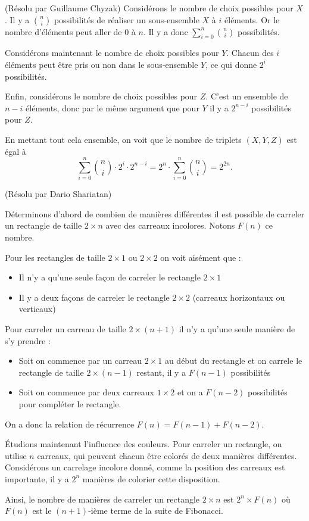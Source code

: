 \begin{sol}[73](R\'esolu par Guillaume Chyzak)
Consid\'erons le nombre de choix possibles pour $X$. Il y a $n\choose i$ possibilit\'es de r\'ealiser un sous-ensemble $X$ \`a $i$ \'el\'ements. Or le nombre d'\'el\'ements peut aller de 0 \`a $n$. Il y a donc $\sum_{i=0}^n {n\choose i}$ possibilit\'es.

Consid\'erons maintenant le nombre de choix possibles pour $Y$. Chacun des $i$ \'el\'ements peut \^etre pris ou non dans le sous-ensemble $Y$, ce qui donne $2^i$ possibilit\'es.

Enfin, consid\'erons le nombre de choix possibles pour $Z$. C'est un ensemble de $n-i$ \'el\'ements, donc par le m\^eme argument que pour $Y$ il y a $2^{n-i}$ possibilit\'es pour $Z$.

En mettant tout cela ensemble, on voit que le nombre de triplets $(X,Y,Z)$ est \'egal \`a
\[\sum_{i=0}^n {n\choose i} \cdot 2^i\cdot 2^{n-i}=2^n\cdot\sum_{i=0}^n {n\choose i}=2^{2n}.\]

\end{sol}

\begin{sol}[75](Résolu par Dario Shariatan)

Déterminons d'abord de combien de manières différentes il est possible de carreler un rectangle de taille $2 \times n$ avec des carreaux incolores. Notons $F(n)$ ce nombre.

Pour les rectangles de taille $2 \times 1$ ou $2 \times 2$ on voit aisément que :
\begin{itemize}
\item Il n'y a qu'une seule façon de carreler le rectangle $2\times 1$
\item Il y a deux façons de carreler le rectangle $2 \times 2$ (carreaux horizontaux ou verticaux)
\end{itemize}

Pour carreler un carreau de taille $2 \times (n+1)$ il n'y a qu'une seule manière de s'y prendre :
\begin{itemize}
\item Soit on commence par un carreau $2 \times 1$ au début du rectangle et on carrele le rectangle de taille $2 \times (n-1)$ restant, il y a $F(n-1)$ possibilités
\item Soit on commence par deux carreaux $1 \times 2$ et on a $F(n-2)$ possibilités pour compléter le rectangle.
\end{itemize}

On a donc la relation de récurrence $F(n) = F(n-1) + F(n-2)$.

Étudions maintenant l'influence des couleurs. Pour carreler un rectangle, on utilise $n$ carreaux, qui peuvent chacun être colorés de deux manières différentes. Considérons un carrelage incolore donné, comme la position des carreaux est importante, il y a $2^n$ manières de colorier cette disposition. 

Ainsi, le nombre de manières de carreler un rectangle $2 \times n$ est $2^n \times F(n)$ où $F(n)$ est le $(n+1)$-ième terme de la suite de Fibonacci.

\end{sol}

